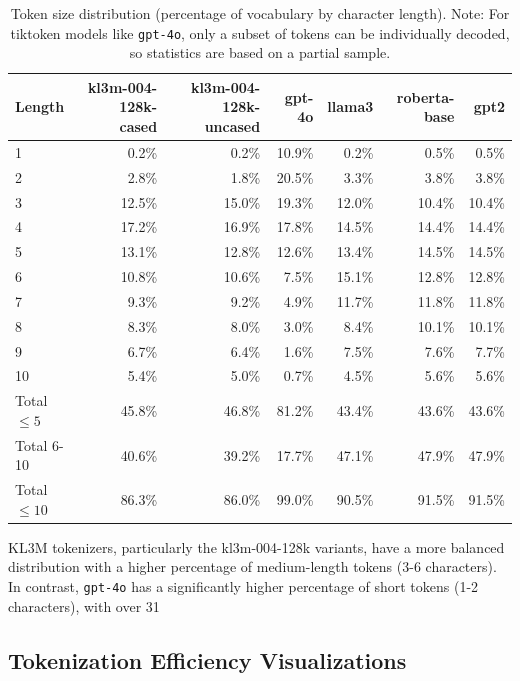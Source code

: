 \begin{table}[htbp]
\centering
\caption{Token size distribution (percentage of vocabulary by character length). Note: For tiktoken models like \texttt{gpt-4o}, only a subset of tokens can be individually decoded, so statistics are based on a partial sample.}
\label{tab:token-size-distribution}
\small
\begin{tabular}{lrrrrrr}
\toprule
Length & kl3m\mbox{-}004\mbox{-}128k\mbox{-}cased & kl3m\mbox{-}004\mbox{-}128k\mbox{-}uncased & gpt\mbox{-}4o & llama3 & roberta\mbox{-}base & gpt2 \\
\midrule
1 & 0.2\% & 0.2\% & 10.9\% & 0.2\% & 0.5\% & 0.5\% \\
2 & 2.8\% & 1.8\% & 20.5\% & 3.3\% & 3.8\% & 3.8\% \\
3 & 12.5\% & 15.0\% & 19.3\% & 12.0\% & 10.4\% & 10.4\% \\
4 & 17.2\% & 16.9\% & 17.8\% & 14.5\% & 14.4\% & 14.4\% \\
5 & 13.1\% & 12.8\% & 12.6\% & 13.4\% & 14.5\% & 14.5\% \\
6 & 10.8\% & 10.6\% & 7.5\% & 15.1\% & 12.8\% & 12.8\% \\
7 & 9.3\% & 9.2\% & 4.9\% & 11.7\% & 11.8\% & 11.8\% \\
8 & 8.3\% & 8.0\% & 3.0\% & 8.4\% & 10.1\% & 10.1\% \\
9 & 6.7\% & 6.4\% & 1.6\% & 7.5\% & 7.6\% & 7.7\% \\
10 & 5.4\% & 5.0\% & 0.7\% & 4.5\% & 5.6\% & 5.6\% \\
\midrule
Total $\leq 5$ & 45.8\% & 46.8\% & 81.2\% & 43.4\% & 43.6\% & 43.6\% \\
Total 6-10 & 40.6\% & 39.2\% & 17.7\% & 47.1\% & 47.9\% & 47.9\% \\
Total $\leq 10$ & 86.3\% & 86.0\% & 99.0\% & 90.5\% & 91.5\% & 91.5\% \\
\bottomrule
\end{tabular}
\end{table}

KL3M tokenizers, particularly the kl3m-004-128k variants, have a more balanced distribution with a higher percentage of medium-length tokens (3-6 characters). In contrast, \texttt{gpt-4o} has a significantly higher percentage of short tokens (1-2 characters), with over 31%

\subsection{Tokenization Efficiency Visualizations}
\label{app:token_efficiency_charts}

